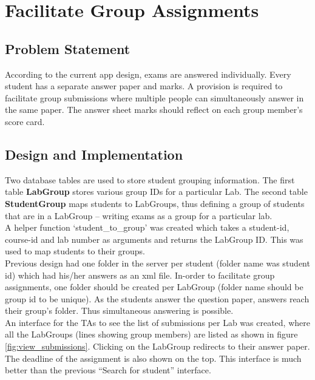 \section{Facilitate Group Assignments}

\subsection{Problem Statement}
According to the current app design, exams are answered individually. Every student has a separate answer paper and marks. A provision is required to facilitate group submissions where multiple people can simultaneously answer in the same paper. The answer sheet marks should reflect on each group member's score card.

\subsection{Design and Implementation}
Two database tables are used to store student grouping information. The first table \textbf{LabGroup} stores various group IDs for a particular Lab. The second table \textbf{StudentGroup} maps students to LabGroups, thus defining a group of students that are in a LabGroup -- writing exams as a group for a particular lab.\\

A helper function `student\_to\_group' was created which takes a student-id, course-id and lab number as arguments and returns the LabGroup ID. This was used to map students to their groups.\\

Previous design had one folder in the server per student (folder name was student id) which had his/her answers as an xml file. In-order to facilitate group assignments, one folder should be created per LabGroup (folder name should be group id to be unique). As the students answer the question paper, answers reach their group's folder. Thus simultaneous answering is possible.\\

An interface for the TAs to see the list of submissions per Lab was created, where all the LabGroups (lines showing group members) are listed as shown in figure \ref{fig:view_submissions}. Clicking on the LabGroup redirects to their answer paper. The deadline of the assignment is also shown on the top. This interface is much better than the previous ``Search for student'' interface.

